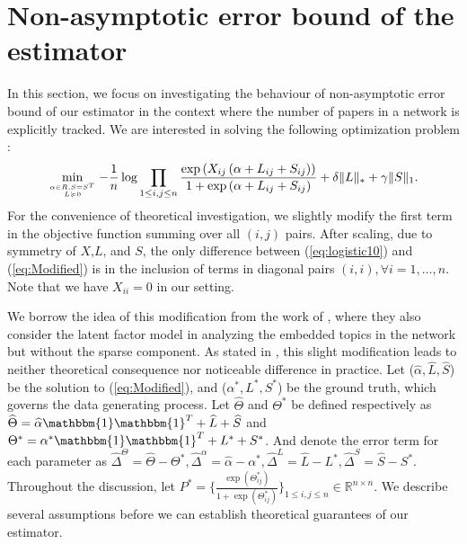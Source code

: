 \documentclass[AMS,STIX1COL]{WileyNJD-v2}
\begin{document}
{\section{Non-asymptotic error bound of the estimator}
\label{sec:theorem}
In this section, we focus on investigating the behaviour of non-asymptotic error bound of our estimator in the context where the number of papers in a network is explicitly tracked. We are interested in solving the following optimization problem :
\begin{equation}\label{eq:Modified}
\min\limits_{\alpha \in R, S = S^T \atop L \succcurlyeq 0}
-\frac{1}{n} \log \prod_{1\le i,j\le n}\frac{\exp\left(X_{ij}\left(\alpha+
L_{ij}+S_{ij}\right)\right)}{1+\exp\left(\alpha+
L_{ij}+S_{ij}\right)} + \delta \|L\|_\ast + \gamma \|S\|_1.
\end{equation}
For the convenience of theoretical investigation, we slightly modify the first term in the objective function summing over all $(i,j)$ pairs.
After scaling, due to symmetry of $X$,$L$, and $S$, the only difference between (\ref{eq:logistic10}) and (\ref{eq:Modified}) is in the inclusion of terms in diagonal pairs $(i,i),\forall i=1,\dots,n$.
Note that we have $X_{ii}=0$ in our setting.

We borrow the idea of this modification from the work of \cite{ma2017exploration}, where they also consider the latent factor model in analyzing the embedded topics in the network but without the sparse component.
As stated in \cite{ma2017exploration}, this slight modification leads to neither theoretical consequence nor noticeable difference in practice.
Let ($\widehat{\alpha},\widehat{L},\widehat{S}$) be the solution to (\ref{eq:Modified}), and ($\alpha^{*},L^{*},S^{*}$) be the ground truth, which governs the data generating process.
Let $\widehat{\Theta}$ and $\Theta^{*}$ be defined respectively as $\widehat{\Theta} = \widehat{\alpha}\mathbbm{1}\mathbbm{1}^T+\widehat{L}+\widehat{S}$ and $\Theta^{*} = \alpha^{*}\mathbbm{1}\mathbbm{1}^T+L^{*}+S^{*}$.
And denote the error term for each parameter as $\widehat{\Delta}^{\Theta} = \widehat{\Theta}-\Theta^{*},
\widehat{\Delta}^{\alpha} = \widehat{\alpha}-\alpha^{*},
\widehat{\Delta}^L = \widehat{L}-L^{*},
\widehat{\Delta}^S = \widehat{S}-S^{*}.$
Throughout the discussion, let $P^{*}=\bigg\{\frac{\exp(\Theta_{ij}^{*})}{1+\exp(\Theta_{ij}^{*})}\bigg\}_{1 \leq i,j \leq n} \in \mathbb{R}^{n \times n}$.
We describe several assumptions before we can establish theoretical guarantees of our estimator.

}
\end{document}
